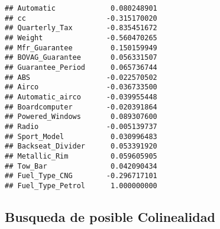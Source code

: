 \documentclass[]{article}
\newenvironment{Shaded}{\begin{snugshade}}{\end{snugshade}}
\newcommand{\DecValTok}[1]{\textcolor[rgb]{0.00,0.00,0.81}{#1}}
\newcommand{\KeywordTok}[1]{\textcolor[rgb]{0.13,0.29,0.53}{\textbf{#1}}}
\newcommand{\NormalTok}[1]{#1}
\newcommand{\OperatorTok}[1]{\textcolor[rgb]{0.81,0.36,0.00}{\textbf{#1}}}
\newcommand{\StringTok}[1]{\textcolor[rgb]{0.31,0.60,0.02}{#1}}
\begin{document}
\begin{verbatim}
## Automatic             0.080248901
## cc                   -0.315170020
## Quarterly_Tax        -0.835451672
## Weight               -0.560470265
## Mfr_Guarantee         0.150159949
## BOVAG_Guarantee       0.056331507
## Guarantee_Period      0.065736744
## ABS                  -0.022570502
## Airco                -0.036733500
## Automatic_airco      -0.039955448
## Boardcomputer        -0.020391864
## Powered_Windows       0.089307600
## Radio                -0.005139737
## Sport_Model           0.030996483
## Backseat_Divider      0.053391920
## Metallic_Rim          0.059605905
## Tow_Bar               0.042090434
## Fuel_Type_CNG        -0.296717101
## Fuel_Type_Petrol      1.000000000
\end{verbatim}

\hypertarget{busqueda-de-posible-colinealidad-1}{%
\subsection{Busqueda de posible
Colinealidad}\label{busqueda-de-posible-colinealidad-1}}

\begin{Shaded}
\end{Shaded}
\end{document}
